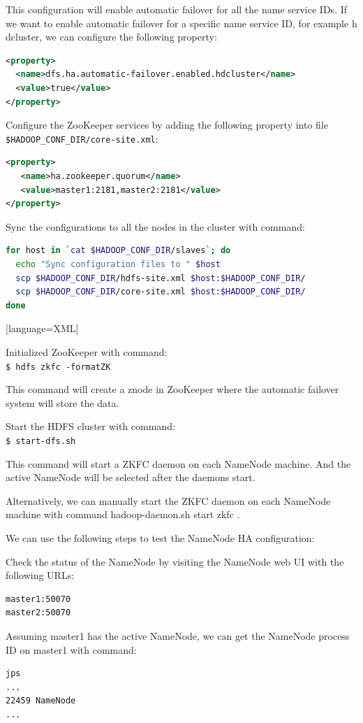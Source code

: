 This configuration will enable automatic failover for all the name service IDs. If we want to enable automatic failover for a specific name service ID, for example h
dcluster, we can configure the following property:
\lstset{style=bashstyle}
\begin{lstlisting}[language=XML]
<property>
  <name>dfs.ha.automatic-failover.enabled.hdcluster</name>
  <value>true</value>
</property>
\end{lstlisting}

Configure the ZooKeeper services by adding the following property into file \verb|$HADOOP_CONF_DIR/core-site.xml|:
\lstset{style=bashstyle}
\begin{lstlisting}[language=XML]
<property>
   <name>ha.zookeeper.quorum</name>
   <value>master1:2181,master2:2181</value>
</property>
\end{lstlisting}

Sync the configurations to all the nodes in the cluster with command:
\lstset{style=bashstyle}
\begin{lstlisting}[language=bash]
for host in `cat $HADOOP_CONF_DIR/slaves`; do
  echo "Sync configuration files to " $host
  scp $HADOOP_CONF_DIR/hdfs-site.xml $host:$HADOOP_CONF_DIR/
  scp $HADOOP_CONF_DIR/core-site.xml $host:$HADOOP_CONF_DIR/
done
\end{lstlisting}[language=XML]

Initialized ZooKeeper with command: \\
\verb|$ hdfs zkfc -formatZK|

This command will create a znode in ZooKeeper where the automatic failover system will store the data.

Start the HDFS cluster with command: \\
\verb|$ start-dfs.sh|

This command will start a ZKFC daemon on each NameNode machine. And the active NameNode will be selected after the daemons start.

Alternatively, we can manually start the ZKFC daemon on each NameNode machine with command hadoop-daemon.sh start zkfc .

We can use the following steps to test the NameNode HA configuration:

Check the status of the NameNode by visiting the NameNode web UI with the following URLs:
\begin{verbatim}
master1:50070
master2:50070
\end{verbatim}

Assuming master1 has the active NameNode, we can get the NameNode process ID on master1 with command:
\begin{verbatim}
jps
...
22459 NameNode
...
\end{verbatim}


